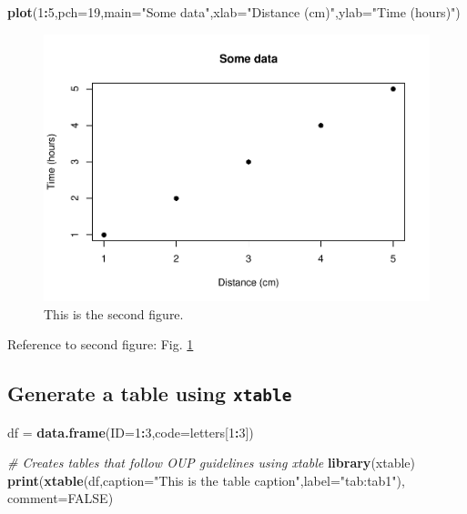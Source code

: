 \documentclass[12pt,halfline,a4paper,]{ouparticle}
\newenvironment{Shaded}{\begin{snugshade}}{\end{snugshade}}
\newcommand{\CommentTok}[1]{\textcolor[rgb]{0.56,0.35,0.01}{\textit{#1}}}
\newcommand{\DataTypeTok}[1]{\textcolor[rgb]{0.13,0.29,0.53}{#1}}
\newcommand{\DecValTok}[1]{\textcolor[rgb]{0.00,0.00,0.81}{#1}}
\newcommand{\KeywordTok}[1]{\textcolor[rgb]{0.13,0.29,0.53}{\textbf{#1}}}
\newcommand{\NormalTok}[1]{#1}
\newcommand{\OperatorTok}[1]{\textcolor[rgb]{0.81,0.36,0.00}{\textbf{#1}}}
\newcommand{\OtherTok}[1]{\textcolor[rgb]{0.56,0.35,0.01}{#1}}
\newcommand{\StringTok}[1]{\textcolor[rgb]{0.31,0.60,0.02}{#1}}
\begin{document}
\begin{Shaded}
\begin{Highlighting}[]
\KeywordTok{plot}\NormalTok{(}\DecValTok{1}\OperatorTok{:}\DecValTok{5}\NormalTok{,}\DataTypeTok{pch=}\DecValTok{19}\NormalTok{,}\DataTypeTok{main=}\StringTok{"Some data"}\NormalTok{,}\DataTypeTok{xlab=}\StringTok{"Distance (cm)"}\NormalTok{,}\DataTypeTok{ylab=}\StringTok{"Time (hours)"}\NormalTok{)}
\end{Highlighting}
\end{Shaded}

\begin{figure}[p]
\includegraphics[width=1\linewidth]{oxford-press_files/figure-latex/fig2-1} \caption{This is the second figure.}\label{fig:fig2}
\end{figure}

Reference to second figure: Fig. \ref{fig:fig2}

\hypertarget{generate-a-table-using-xtable}{%
\subsection{\texorpdfstring{Generate a table using \texttt{xtable}}{Generate a table using xtable}}\label{generate-a-table-using-xtable}}

\begin{Shaded}
\begin{Highlighting}[]
\NormalTok{df =}\StringTok{ }\KeywordTok{data.frame}\NormalTok{(}\DataTypeTok{ID=}\DecValTok{1}\OperatorTok{:}\DecValTok{3}\NormalTok{,}\DataTypeTok{code=}\NormalTok{letters[}\DecValTok{1}\OperatorTok{:}\DecValTok{3}\NormalTok{])}

\CommentTok{\# Creates tables that follow OUP guidelines using xtable}
\KeywordTok{library}\NormalTok{(xtable) }
\KeywordTok{print}\NormalTok{(}\KeywordTok{xtable}\NormalTok{(df,}\DataTypeTok{caption=}\StringTok{"This is the table caption"}\NormalTok{,}\DataTypeTok{label=}\StringTok{"tab:tab1"}\NormalTok{),}
      \DataTypeTok{comment=}\OtherTok{FALSE}\NormalTok{)}
\end{Highlighting}
\end{Shaded}
\end{document}
